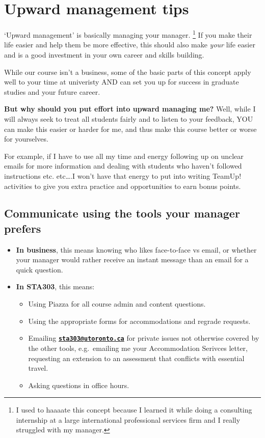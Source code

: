 \documentclass[
  openany]{book}
\providecommand{\tightlist}{%
  \setlength{\itemsep}{0pt}\setlength{\parskip}{0pt}}
\begin{document}
\hypertarget{upward-management-tips}{%
\section{Upward management tips}\label{upward-management-tips}}

`Upward management' is basically managing your manager. \footnote{I used to haaaate this concept because I learned it while doing a consulting internship at a large international professional services firm and I really struggled with my manager.} If you make their life easier and help them be more effective, this should also make \emph{your} life easier and is a good investment in your own career and skills building.

While our course isn't a business, some of the basic parts of this concept apply well to your time at univeristy AND can set you up for success in graduate studies and your future career.

\textbf{But why should you put effort into upward managing me?} Well, while I will always seek to treat all students fairly and to listen to your feedback, YOU can make this easier or harder for me, and thus make this course better or worse for yourselves.

For example, if I have to use all my time and energy following up on unclear emails for more information and dealing with students who haven't followed instructions etc. etc\ldots.I won't have that energy to put into writing TeamUp! activities to give you extra practice and opportunities to earn bonus points.

\hypertarget{communicate-using-the-tools-your-manager-prefers}{%
\subsection{Communicate using the tools your manager prefers}\label{communicate-using-the-tools-your-manager-prefers}}

\begin{itemize}
\tightlist
\item
  \textbf{In business}, this means knowing who likes face-to-face vs email, or whether your manager would rather receive an instant message than an email for a quick question.
\item
  \textbf{In STA303}, this means:

  \begin{itemize}
  \tightlist
  \item
    Using Piazza for all course admin and content questions.
  \item
    Using the appropriate forms for accommodations and regrade requests.
  \item
    Emailing \textbf{\href{mailto:sta303@utoronto.ca}{\nolinkurl{sta303@utoronto.ca}}} for private issues not otherwise covered by the other tools, e.g.~emailing me your Accommodation Serivces letter, requesting an extension to an assessment that conflicts with essential travel.
  \item
    Asking questions in office hours.
  \end{itemize}
\end{itemize}
\end{document}
